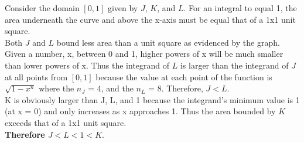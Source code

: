 \documentclass[12pt]{article}
\begin{document}
Consider the domain $[0,1]$ given by $J$, $K$, and $L$. For an integral to equal 1, the area underneath the curve and above the x-axis must be equal that of a 1x1 unit square. \\
Both $J$ and $L$ bound less area than a unit square as evidenced by the graph. Given a number, x, between 0 and 1, higher powers of x will be much smaller than lower powers of x. Thus the integrand of $L$ is larger than the integrand of $J$ at all points from $[0,1]$ because the value at each point of the function is $\sqrt{1 - x^n}$ where the $n_J$ = 4, and the $n_L$ = 8. Therefore, $J < L$. \\

K is obviously larger than J, L, and 1 because the integrand's minimum value is 1 (at x = 0) and only increases as x approaches 1. Thus the area bounded by $K$ exceeds that of a 1x1 unit square.\\

\textbf{Therefore $J<L<1<K$}.
\end{document}
